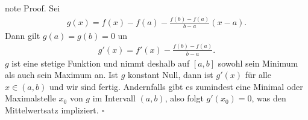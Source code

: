 \documentclass[letterpaper,10pt,english]{jupyterBook}
\begin{document}
\begin{sphinxadmonition}{note}
Proof. Sei
\begin{equation*}
\begin{split} g(x) = f(x) - f(a) - \frac{f(b) - f(a)}{b-a}(x-a).\end{split}
\end{equation*}
Dann gilt \(g(a) = g(b) = 0\) un
\begin{equation*}
\begin{split} g'(x) = f'(x) -  \frac{f(b) - f(a)}{b-a}.\end{split}
\end{equation*}
\(g\) ist eine stetige Funktion und nimmt deshalb auf \([a,b]\) sowohl sein Minimum als auch sein Maximum an. Ist \(g\) konstant Null, dann ist \(g'(x)\) für alle \(x \in (a,b)\) und wir sind fertig. Andernfalls gibt es zumindest eine Minimal\sphinxhyphen{} oder Maximalstelle \(x_0\) von \(g\) im Intervall \((a,b)\), also folgt \(g'(x_0)=0\), was den Mittelwertsatz impliziert. \(\square\)
\end{sphinxadmonition}
\end{document}
